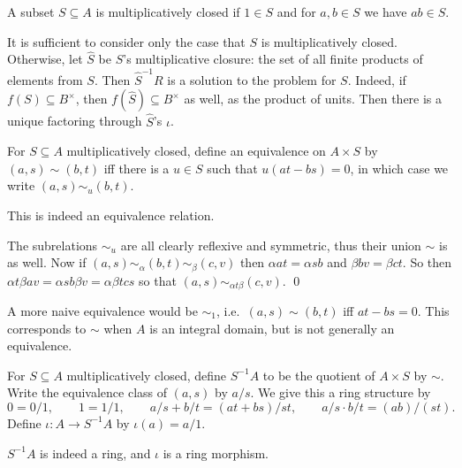     A subset $S\subseteq A$ is {\emphcolor multiplicatively closed} if $1\in S$ and for $a,b\in S$ we have $ab\in S$.

\edefn

It is sufficient to consider only the case that $S$ is multiplicatively closed.
Otherwise, let $\hat S$ be $S$'s multiplicative closure: the set of all finite products of elements from $S$.
Then $\hat S^{-1}R$ is a solution to the problem for $S$.
Indeed, if $f(S)\subseteq B^\times$, then $f(\hat S)\subseteq B^\times$ as well, as the product of units.
Then there is a unique factoring through $\hat S$'s $\iota$.

\bdefn

    For $S\subseteq A$ multiplicatively closed, define an equivalence on $A\times S$ by $(a,s)\sim(b,t)$ iff there is a
    $u\in S$ such that $u(at-bs)=0$, in which case we write $(a,s)\sim_u(b,t)$.

\edefn

\blemm

    This is indeed an equivalence relation.

\elemm

\bproof

    The subrelations $\sim_u$ are all clearly reflexive and symmetric, thus their union $\sim$ is as well.
    Now if $(a,s)\sim_\alpha(b,t)\sim_\beta(c,v)$ then $\alpha at=\alpha sb$ and $\beta bv=\beta ct$.
    So then $\alpha t\beta av=\alpha sb\beta v=\alpha\beta tcs$ so that $(a,s)\sim_{\alpha t\beta}(c,v)$.
    \qed

\eproof

\bexam

    A more naive equivalence would be $\sim_1$, i.e.\ $(a,s)\sim(b,t)$ iff $at-bs=0$.
    This corresponds to $\sim$ when $A$ is an integral domain, but is not generally an equivalence.

\eexam

\bdefn

    For $S\subseteq A$ multiplicatively closed, define $S^{-1}A$ to be the quotient of $A\times S$ by $\sim$.
    Write the equivalence class of $(a,s)$ by $a/s$.
    We give this a ring structure by
    $$ 0 = 0/1,\qquad 1 = 1/1,\qquad a/s + b/t = (at+bs)/st,\qquad a/s \cdot b/t = (ab)/(st) . $$
    Define $\iota\colon A\to S^{-1}A$ by $\iota(a)=a/1$.

\edefn

\bprop

    $S^{-1}A$ is indeed a ring, and $\iota$ is a ring morphism.

